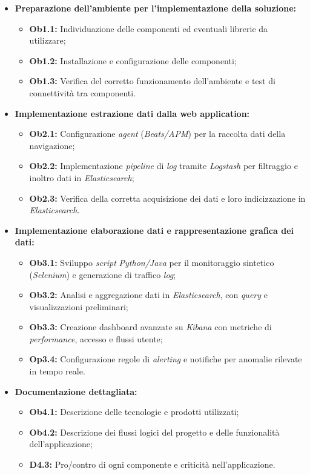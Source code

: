 \begin{itemize}
    \item \textbf{Preparazione dell'ambiente per l'implementazione della soluzione:}  
        \begin{itemize}
            \item \textbf{Ob1.1:} Individuazione delle componenti ed eventuali librerie da utilizzare;
            \item \textbf{Ob1.2:} Installazione e configurazione delle componenti;
            \item \textbf{Ob1.3:} Verifica del corretto funzionamento dell’ambiente e test di connettività tra componenti.
        \end{itemize}
    \item \textbf{Implementazione estrazione dati dalla web application:}  
        \begin{itemize}
            \item \textbf{Ob2.1:} Configurazione \emph{agent} (\emph{Beats/APM}) per la raccolta dati della navigazione;
            \item \textbf{Ob2.2:} Implementazione \emph{pipeline} di \emph{log} tramite \emph{Logstash} per filtraggio e inoltro dati in \emph{Elasticsearch};
            \item \textbf{Ob2.3:} Verifica della corretta acquisizione dei dati e loro indicizzazione in \emph{Elasticsearch}.
        \end{itemize}
    \item \textbf{Implementazione elaborazione dati e rappresentazione grafica dei dati:}  
        \begin{itemize}
            \item \textbf{Ob3.1:} Sviluppo \emph{script} \emph{Python/Java} per il monitoraggio sintetico (\emph{Selenium}) e generazione di traffico \emph{log};
            \item \textbf{Ob3.2:} Analisi e aggregazione dati in \emph{Elasticsearch}, con \emph{query} e visualizzazioni preliminari;
            \item \textbf{Ob3.3:} Creazione dashboard avanzate su \emph{Kibana} con metriche di \emph{performance}, accesso e flussi utente;
            \item \textbf{Op3.4:} Configurazione regole di \emph{alerting} e notifiche per anomalie rilevate in tempo reale.
        \end{itemize}
    \item \textbf{Documentazione dettagliata:}  
        \begin{itemize}
            \item \textbf{Ob4.1:} Descrizione delle tecnologie e prodotti utilizzati;
            \item \textbf{Ob4.2:} Descrizione dei flussi logici del progetto e delle funzionalità dell'applicazione;
            \item \textbf{D4.3:} Pro/contro di ogni componente e criticità nell'applicazione.
        \end{itemize}
\end{itemize} 